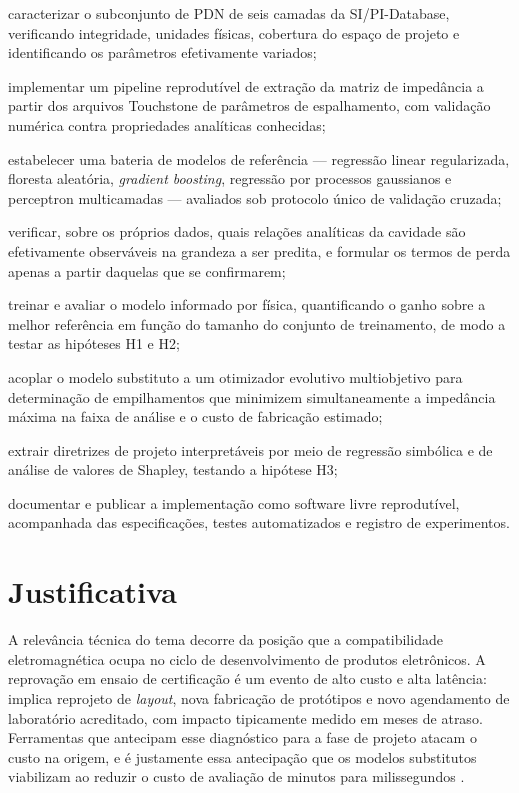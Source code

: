 \begin{alineas}
\item caracterizar o subconjunto de PDN de seis camadas da SI/PI-Database,
verificando integridade, unidades físicas, cobertura do espaço de projeto e
identificando os parâmetros efetivamente variados;

\item implementar um pipeline reprodutível de extração da matriz de impedância a
partir dos arquivos Touchstone de parâmetros de espalhamento, com validação
numérica contra propriedades analíticas conhecidas;

\item estabelecer uma bateria de modelos de referência — regressão linear
regularizada, floresta aleatória, \textit{gradient boosting}, regressão por
processos gaussianos e perceptron multicamadas — avaliados sob protocolo único de
validação cruzada;

\item verificar, sobre os próprios dados, quais relações analíticas da cavidade
são efetivamente observáveis na grandeza a ser predita, e formular os termos de
perda apenas a partir daquelas que se confirmarem;

\item treinar e avaliar o modelo informado por física, quantificando o ganho
sobre a melhor referência em função do tamanho do conjunto de treinamento, de
modo a testar as hipóteses H1 e H2;

\item acoplar o modelo substituto a um otimizador evolutivo multiobjetivo para
determinação de empilhamentos que minimizem simultaneamente a impedância máxima
na faixa de análise e o custo de fabricação estimado;

\item extrair diretrizes de projeto interpretáveis por meio de regressão
simbólica e de análise de valores de Shapley, testando a hipótese H3;

\item documentar e publicar a implementação como software livre reprodutível,
acompanhada das especificações, testes automatizados e registro de experimentos.
\end{alineas}

\section{Justificativa}
\label{sec:justificativa}

A relevância técnica do tema decorre da posição que a compatibilidade
eletromagnética ocupa no ciclo de desenvolvimento de produtos eletrônicos. A
reprovação em ensaio de certificação é um evento de alto custo e alta latência:
implica reprojeto de \textit{layout}, nova fabricação de protótipos e novo
agendamento de laboratório acreditado, com impacto tipicamente medido em meses de
atraso. Ferramentas que antecipam esse diagnóstico para a fase de projeto atacam
o custo na origem, e é justamente essa antecipação que os modelos substitutos
viabilizam ao reduzir o custo de avaliação de minutos para milissegundos
\citep{zhang2021}.

